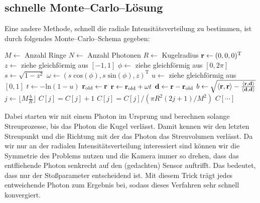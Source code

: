 	\subsection{schnelle Monte--Carlo--Lösung}
	Eine andere Methode, schnell die radiale Intensitätsverteilung zu bestimmen, ist durch folgendes Monte--Carlo--Schema gegeben:
	\begin{algorithmic}
		\STATE $M\leftarrow$ Anzahl Ringe
		\STATE $N\leftarrow$ Anzahl Photonen
		\STATE $R\leftarrow$ Kugelradius
			\STATE $\mathbf{r}\leftarrow (0,0,0)^\text{T}$
			\REPEAT
				\STATE{}
				\STATE $z\leftarrow$ ziehe gleichförmig aus $[-1,1]$
				\STATE $\phi\leftarrow$ ziehe gleichförmig aus $[0,2\pi]$
				\STATE $s\leftarrow\sqrt{1-z^2}$
				\STATE $\omega\leftarrow (s\;\text{cos}(\phi),s\;\text{sin}(\phi),z)^\text{T}$
				\STATE{}
				\STATE $u\leftarrow$ ziehe gleichförmig aus $[0,1]$
				\STATE $t\leftarrow -\text{ln}(1-u)$
				\STATE $\mathbf{r}_\text{old}\leftarrow\mathbf{r}$
				\STATE $\mathbf{r}\leftarrow\mathbf{r}_\text{old}+\omega t$
			\STATE{}
			\STATE $\mathbf{d}\leftarrow\mathbf{r}-\mathbf{r}_\text{old}$
			\STATE $b\leftarrow\sqrt{\langle\mathbf{r},\mathbf{r}\rangle-\frac{\langle\mathbf{r},\mathbf{d}\rangle}{\langle\mathbf{d},\mathbf{d}\rangle}}$
			\STATE $j\leftarrow\lfloor M\frac{b}{R}\rfloor$
			\STATE $C[j]=C[j]+1$
		\ENDFOR
			\STATE $C[j]=C[j]/(\pi R^2(2j+1)/M^2)$
		\ENDFOR
		\RETURN $C[\cdots]$
	\end{algorithmic}
	Dabei starten wir mit einem Photon im Ursprung und berechnen solange Streuprozesse, bis das Photon die Kugel verlässt. Damit kennen wir den letzten Streupunkt und die Richtung mit der das Photon das Streuvolumen verlässt. Da wir nur an der radialen Intensitätsverteilung interessiert sind können wir die Symmetrie des Problems nutzen und die Kamera immer so drehen, dass das entfliehende Photon senkrecht auf den (gedachten) Sensor auftrifft. Das bedeutet, dass nur der Stoßparameter entscheidend ist. Mit diesem Trick trägt jedes entweichende Photon zum Ergebnis bei, sodass dieses Verfahren sehr schnell konvergiert.
	
	
